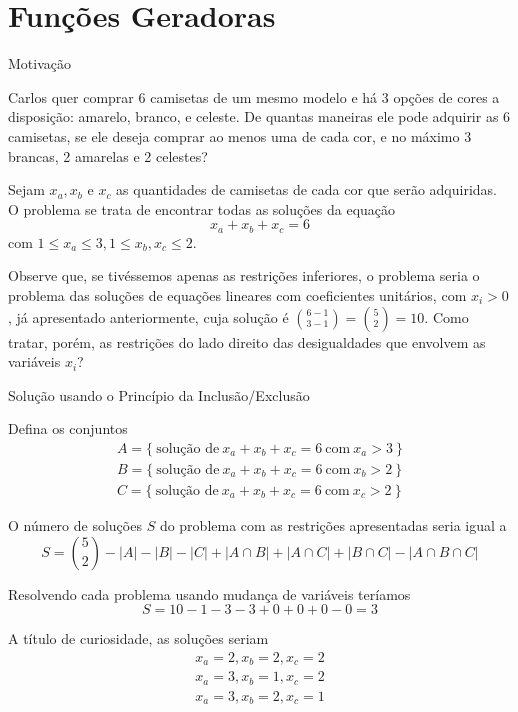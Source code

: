 \section*{Funções Geradoras}

\begin{frame}[fragile]{Motivação}

Carlos quer comprar 6 camisetas de um mesmo modelo e há 3 opções de cores a disposição: amarelo,
branco, e celeste. De quantas maneiras ele pode adquirir as 6 camisetas, se ele deseja comprar ao
menos uma de cada cor, e no máximo 3 brancas, 2 amarelas e 2 celestes?

Sejam $x_a, x_b$ e $x_c$ as quantidades de camisetas de cada cor que serão adquiridas. O problema se
trata de encontrar todas as soluções da equação
\[
        x_a + x_b + x_c = 6
\]
com $1 \leq x_a \leq 3, 1 \leq x_b, x_c \leq 2$.

Observe que, se tivéssemos apenas as restrições inferiores,
o problema seria o problema das soluções de equações lineares com coeficientes unitários, com
$x_i > 0$, já apresentado anteriormente, cuja solução é $\binom{6 - 1}{3 - 1} = \binom{5}{2} = 10$.
Como tratar, porém, as restrições do lado direito das desigualdades que envolvem as variáveis
$x_i$?

\end{frame}

\begin{frame}[fragile]{Solução usando o Princípio da Inclusão/Exclusão}

Defina os conjuntos
\[
\begin{array}{l}
        A = \{\  \mbox{solução de}\ x_a + x_b + x_c = 6\ \mbox{com}\ x_a > 3\ \}\\
        B = \{\  \mbox{solução de}\ x_a + x_b + x_c = 6\ \mbox{com}\ x_b > 2\ \}\\
        C = \{\  \mbox{solução de}\ x_a + x_b + x_c = 6\ \mbox{com}\ x_c > 2\ \}
\end{array}
\]

O número de soluções $S$ do problema com as restrições apresentadas seria igual a
\[
        S = \binom{5}{2} - | A | - | B | - | C | 
          + | A \cap B | + | A \cap C | + | B \cap C | - | A \cap B \cap C |
\]

Resolvendo cada problema usando mudança de variáveis teríamos
\[
        S = 10 - 1 - 3 - 3 + 0 + 0 + 0 - 0 = 3
\]

A título de curiosidade, as soluções seriam
\[
\begin{array}{l}
        x_a = 2, x_b = 2, x_c = 2\\
        x_a = 3, x_b = 1, x_c = 2\\
        x_a = 3, x_b = 2, x_c = 1
\end{array}
\]


\end{frame}

